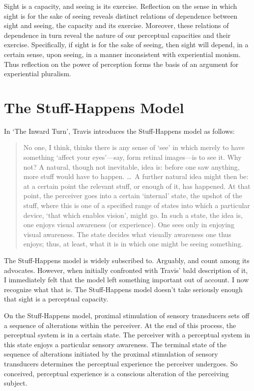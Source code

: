 \documentclass[12pt]{article}
\begin{document}
Sight is a capacity, and seeing is its exercise. Reflection on the sense in which sight is for the sake of seeing reveals distinct relations of dependence between sight and seeing, the capacity and its exercise. Moreover, these relations of dependence in turn reveal the nature of our perceptual capacities and their exercise. Specifically, if sight is for the sake of seeing, then sight will depend, in a certain sense, upon seeing, in a manner inconsistent with experiential monism. Thus reflection on the power of perception forms the basis of an argument for experiential pluralism.


\section{The Stuff-Happens Model} %
\label{sec:the_stuff_happens_model}

In `The Inward Turn', Travis introduces the Stuff-Happens model as follows:
\begin{quote}
    No one, I think, thinks there is any sense of ‘see’ in which merely to have something `affect your eyes'---say, form retinal images---is to see it. Why not? A natural, though not inevitable, idea is: before one saw anything, more stuff would have to happen. \ldots\ A further natural idea might then be: at a certain point the relevant stuff, or enough of it, has happened. At that point, the perceiver goes into a certain `internal' state, the upshot of the stuff, where this is one of a specified range of states into which a particular device, `that which enables vision', might go. In such a state, the idea is, one enjoys visual awareness (or experience). One sees only in enjoying visual awareness. The state decides what visually awareness one thus enjoys; thus, at least, what it is in which one might be seeing something. \citep[315]{Travis:2009fk}
\end{quote}
The Stuff-Happens model is widely subscribed to. Arguably, \citet{Evans:1982ly} and \citet{Burge:2010uq} count among its advocates. However, when initially confronted with Travis' bald description of it, I immediately felt that the model left something important out of account. I now recognize what that is. The Stuff-Happens model doesn't take seriously enough that sight is a perceptual capacity.

On the Stuff-Happens model, proximal stimulation of sensory transducers sets off a sequence of alterations within the perceiver. At the end of this process, the perceptual system is in a certain state. The perceiver with a perceptual system in this state enjoys a particular sensory awareness. The terminal state of the sequence of alterations initiated by the proximal stimulation of sensory transducers determines the perceptual experience the perceiver undergoes. So conceived, perceptual experience is a conscious alteration of the perceiving subject.
\end{document}
